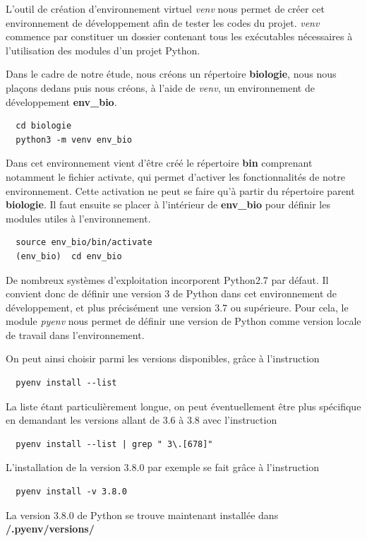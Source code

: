 \documentclass[twoside,a4paper,11pt,frenchb,openany]{report}
\begin{document}
L'outil de création d'environnement virtuel \textit{venv} nous permet de créer cet environnement de développement afin de tester les codes du projet. \textit{venv} commence par constituer un dossier contenant tous les exécutables nécessaires à l'utilisation des modules d'un projet Python. 

Dans le cadre de notre étude, nous créons un répertoire \textbf{biologie}, nous nous plaçons dedans puis nous créons, à l'aide de \textit{venv}, un environnement de développement \textbf{env\_bio}. 
\begin{verbatim}  cd biologie
  python3 -m venv env_bio\end{verbatim}

Dans cet environnement vient d'être créé le répertoire \textbf{bin} comprenant notamment le fichier activate, qui permet d'activer les fonctionnalités de notre environnement.
Cette activation ne peut se faire qu'à partir du répertoire parent \textbf{biologie}. Il faut ensuite se placer à l'intérieur de \textbf{env\_bio} pour définir les modules utiles à l'environnement. 
 \begin{verbatim}  source env_bio/bin/activate
  (env_bio)  cd env_bio\end{verbatim}

De nombreux systèmes d'exploitation incorporent Python2.7 par défaut. Il convient donc de définir une version 3 de Python dans cet environnement de développement, et plus précisément une version 3.7 ou supérieure. Pour cela, le module \textit{pyenv}  nous permet de définir une version de Python comme version locale de travail dans l'environnement. 

On peut ainsi choisir parmi les versions disponibles, grâce à l'instruction
\begin{verbatim}  pyenv install --list\end{verbatim}
La liste étant particulièrement longue, on peut éventuellement être plus spécifique en demandant les versions allant de 3.6 à 3.8 avec l'instruction
\begin{verbatim}  pyenv install --list | grep " 3\.[678]"\end{verbatim}

L'installation de la version 3.8.0 par exemple se fait grâce à l'instruction
\begin{verbatim}  pyenv install -v 3.8.0\end{verbatim}

La version 3.8.0 de Python se trouve maintenant installée dans \textbf{\raisebox{-1ex}{\textasciitilde}/.pyenv/versions/}
\end{document}
